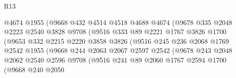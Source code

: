 \begin{lexlean}{R13}
\begin{coremodule}
                              @4674
                              @1955
                              (@9668
                                @432
                                @4514
                                @4518
                                @4688
                                @4674
                                (@9678
                                  @335
                                  @2048
                                  @2223
                                  @2540
                                  @3828
                                  @9708
                                  (@9516
                                    @333
                                    @89
                                    @2221
                                    @1767
                                    @3826
                                    @1700
                                    (@9653
                                      @332
                                      @2215
                                      @2220
                                      @3858
                                      @3826
                                      (@9516
                                        @245
                                        @236
                                        @2068
                                        @1769
                                        @2542
                                        @1955
                                        (@9668
                                          @244
                                          @2063
                                          @2067
                                          @2597
                                          @2542
                                          (@9678
                                            @243
                                            @2048
                                            @2062
                                            @2540
                                            @2596
                                            @9708
                                            (@9516
                                              @241
                                              @89
                                              @2060
                                              @1767
                                              @2594
                                              @1700
                                              (@9668
                                                @240
                                                @2050

\end{coremodule}
\end{lexlean}
